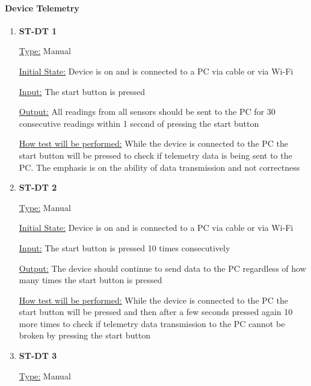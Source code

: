 \documentclass[12pt, titlepage]{article}
\begin{document}
\paragraph{Device Telemetry}	
\begin{enumerate}

  \item{\bf{ST-DT 1}}
  
  \underline{Type:} Manual
            
  \underline{Initial State:} Device is on and is connected to a PC via cable or via Wi-Fi
            
  \underline{Input:} The start button is pressed
            
  \underline{Output:} All readings from all sensors should be sent to the PC for 30 consecutive readings within 1 second of pressing the start button
  
            
  \underline{How test will be performed:} While the device is connected to the PC the start button will be pressed to check if telemetry data is being sent to the PC. The emphasis is on the ability of data transmission and not correctness\\

  \item{\bf{ST-DT 2}}
  
  \underline{Type:} Manual
            
  \underline{Initial State:} Device is on and is connected to a PC via cable or via Wi-Fi
            
  \underline{Input:} The start button is pressed 10 times consecutively
            
  \underline{Output:} The device should continue to send data to the PC regardless of how many times the start button is pressed
  
            
  \underline{ How test will be performed:} While the device is connected to the PC the start button will be pressed and then after a few seconds pressed again 10 more times to check if telemetry data transmission to the PC cannot be broken by pressing the start button\\
\newpage
  \item{\bf{ST-DT 3}}
  
  \underline{Type:} Manual
            

\end{enumerate}
\end{document}
